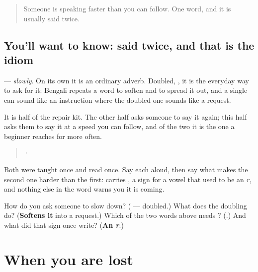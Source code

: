 \label{lesson:BN-R30-second-pass-slowly-and-two-signs}



\begin{quote}
Someone is speaking faster than you can follow. One word, and it is usually said twice.
\end{quote}

\subsection*{You'll want to know: said twice, and that is the idiom}
\textbf{} — \emph{slowly}. On its own it is an ordinary adverb. Doubled, \textbf{ }, it is the everyday way to ask for it: Bengali repeats a word to soften and to spread it out, and a single \textbf{} can sound like an instruction where the doubled one sounds like a request.

It is half of the repair kit. The other half asks someone to say it again; this half asks them to say it at a speed you can follow, and of the two it is the one a beginner reaches for more often.

\begin{tcolorbox}[breakable,skin=enhanced,colback=orange!6,colframe=orange!45!black,boxrule=0.5pt,arc=1mm,left=6pt,right=6pt,top=4pt,bottom=4pt,fonttitle=\bfseries,title={Read this}]
\begin{quote}
 · 
\end{quote}

Both were taught once and read once. Say each aloud, then say what makes the second one harder than the first: \textbf{} carries \textbf{}, a sign for a vowel that used to be an \emph{r}, and nothing else in the word warns you it is coming.
\end{tcolorbox}

\begin{tcolorbox}[breakable,colback=teal!4,colframe=teal!35!black,title={Before you move on}]
How do you ask someone to slow down? (\textbf{ } — doubled.) What does the doubling do? (\textbf{Softens it} into a request.) Which of the two words above needs \textbf{}? (\textbf{}.) And what did that sign once write? (\textbf{An \emph{r}}.)
\end{tcolorbox}
\section[\texorpdfstring{\bn{যে} · \bn{যখন} · \bn{আবার} … (je · jôkhon …)}{যে · যখন · আবার … (je · jôkhon …)}]{When you are lost}

